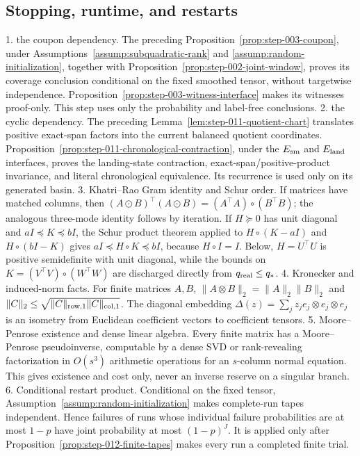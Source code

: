\subsection{Stopping, runtime, and restarts}\label{app:step-012}

1. the coupon dependency.  The preceding
   Proposition~\ref{prop:step-003-coupon}, under
   Assumptions~\ref{assump:subquadratic-rank} and
   \ref{assump:random-initialization}, together with
   Proposition~\ref{prop:step-002-joint-window}, proves its coverage conclusion
   conditional on the fixed smoothed tensor, without targetwise
   independence.  Proposition~\ref{prop:step-003-witness-interface} makes its
   witnesses proof-only.  This step uses only the probability and label-free
   conclusions.
2. the cyclic dependency.  The preceding
   Lemma~\ref{lem:step-011-quotient-chart} translates positive exact-span
   factors into the current balanced quotient coordinates.
   Proposition~\ref{prop:step-011-chronological-contraction}, under the
   \(E_{\rm sm}\) and \(E_{\rm land}\) interfaces, proves the landing-state
   contraction,
   exact-span/positive-product invariance, and literal chronological
   equivalence.  Its recurrence is used only on its generated basin.
3. Khatri--Rao Gram identity and Schur order.  If matrices have matched
   columns, then
   \((A\odot B)^\top(A\odot B)=(A^\top A)\circ(B^\top B)\); the analogous
   three-mode identity follows by iteration.  If \(H\succeq0\) has unit
   diagonal and \(aI\preceq K\preceq bI\), the Schur product theorem applied
   to \(H\circ(K-aI)\) and \(H\circ(bI-K)\) gives
   \(aI\preceq H\circ K\preceq bI\), because \(H\circ I=I\).  Below,
   \(H=U^\top U\) is positive semidefinite with unit diagonal, while the
   bounds on \(K=(V^\top V)\circ(W^\top W)\) are discharged directly from
   \(q_{\rm real}\le q_*\).
4. Kronecker and induced-norm facts.  For finite matrices \(A,B\),
   \(\|A\otimes B\|_2=\|A\|_2\|B\|_2\) and
   \(\|C\|_2\le\sqrt{\|C\|_{\rm row,1}\|C\|_{\rm col,1}}\).  The
   diagonal embedding
   \(\Delta(z)=\sum_jz_je_j\otimes e_j\otimes e_j\) is an isometry from
   Euclidean coefficient vectors to coefficient tensors.
5. Moore--Penrose existence and dense linear algebra.  Every finite
   matrix has a Moore--Penrose pseudoinverse, computable by a dense SVD or
   rank-revealing factorization in \(O(s^3)\) arithmetic operations for an
   \(s\)-column normal equation.  This gives existence and cost only, never
   an inverse reserve on a singular branch.
6. Conditional restart product.  Conditional on the fixed tensor,
   Assumption~\ref{assump:random-initialization} makes complete-run tapes
   independent.  Hence failures of runs whose individual failure
   probabilities are at most \(1-p\) have joint probability at most
   \((1-p)^J\).  It is applied only after
   Proposition~\ref{prop:step-012-finite-tapes} makes every run a completed
   finite trial.

